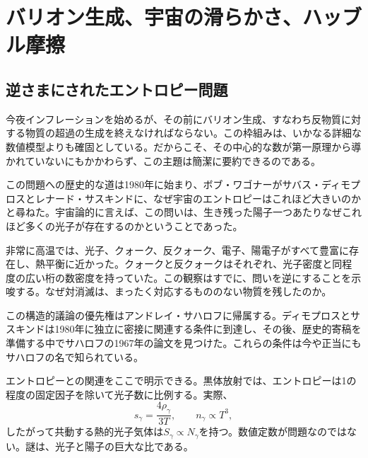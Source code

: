 \chapter{バリオン生成、宇宙の滑らかさ、ハッブル摩擦}


\section{逆さまにされたエントロピー問題}

今夜インフレーションを始めるが、その前にバリオン生成、すなわち反物質に対する物質の超過の生成を終えなければならない。この枠組みは、いかなる詳細な数値模型よりも確固としている。だからこそ、その中心的な数が第一原理から導かれていないにもかかわらず、この主題は簡潔に要約できるのである。

この問題への歴史的な道は1980年に始まり、ボブ・ワゴナーがサバス・ディモプロスとレナード・サスキンドに、なぜ宇宙のエントロピーはこれほど大きいのかと尋ねた。宇宙論的に言えば、この問いは、生き残った陽子一つあたりなぜこれほど多くの光子が存在するのかということであった。

非常に高温では、光子、クォーク、反クォーク、電子、陽電子がすべて豊富に存在し、熱平衡に近かった。クォークと反クォークはそれぞれ、光子密度と同程度の広い桁の数密度を持っていた。この観察はすでに、問いを逆にすることを示唆する。なぜ対消滅は、まったく対応するもののない物質を残したのか。

この構造的議論の優先権はアンドレイ・サハロフに帰属する。ディモプロスとサスキンドは1980年に独立に密接に関連する条件に到達し、その後、歴史的寄稿を準備する中でサハロフの1967年の論文を見つけた。これらの条件は今や正当にもサハロフの名で知られている。

エントロピーとの関連をここで明示できる。黒体放射では、エントロピーは1の程度の固定因子を除いて光子数に比例する。実際、
\begin{equation}
s_\gamma=\frac{4\rho_\gamma}{3T},
\qquad
n_\gamma\propto T^3,
\end{equation}
したがって共動する熱的光子気体は\(S_\gamma\propto N_\gamma\)を持つ。数値定数が問題なのではない。謎は、光子と陽子の巨大な比である。

